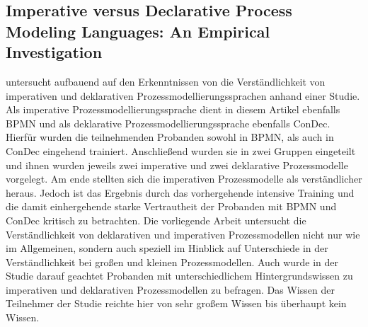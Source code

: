 \subsection{Imperative versus Declarative Process Modeling Languages: An Empirical Investigation}

\cite{pichler2012} untersucht aufbauend auf den Erkenntnissen von  \cite{fahland2009} die Verständlichkeit von imperativen und deklarativen Prozessmodellierungssprachen anhand einer Studie. Als imperative Prozessmodellierungssprache dient in diesem Artikel ebenfalls BPMN und als deklarative Prozessmodellierungssprache ebenfalls ConDec. \newline 
Hierfür wurden die teilnehmenden Probanden sowohl in BPMN, als auch in ConDec eingehend trainiert. Anschließend wurden sie in zwei Gruppen eingeteilt und ihnen wurden jeweils zwei imperative und zwei deklarative Prozessmodelle vorgelegt. Am ende stellten sich die imperativen Prozessmodelle als verständlicher heraus. Jedoch ist das Ergebnis durch das vorhergehende intensive Training und die damit einhergehende starke Vertrautheit der Probanden mit BPMN und ConDec kritisch zu betrachten. \newline
Die vorliegende Arbeit untersucht die Verständlichkeit von deklarativen und imperativen Prozessmodellen nicht nur wie \cite{pichler2012} im Allgemeinen, sondern auch speziell im Hinblick auf Unterschiede in der Verständlichkeit bei großen und kleinen Prozessmodellen. Auch wurde in der Studie darauf geachtet Probanden mit unterschiedlichem Hintergrundswissen zu imperativen und deklarativen Prozessmodellen zu befragen. Das Wissen der Teilnehmer der Studie reichte hier von sehr großem Wissen bis überhaupt kein Wissen.\newline

